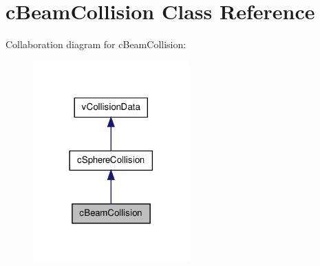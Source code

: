 \hypertarget{classc_beam_collision}{
\section{cBeamCollision Class Reference}
\label{classc_beam_collision}
}


Collaboration diagram for cBeamCollision:\nopagebreak
\begin{figure}[H]
\begin{center}
\leavevmode
\includegraphics[width=170pt]{classc_beam_collision__coll__graph}
\end{center}
\end{figure}
